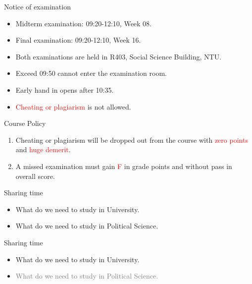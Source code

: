 \documentclass{beamer}
\begin{document}
\begin{frame}{Notice of examination}
\begin{itemize}
\item Midterm examination: 09:20-12:10, Week 08.
\item Final examination: 09:20-12:10, Week 16.
\item Both examinations are held in R403, Social Science Building, NTU.
\item Exceed 09:50 cannot enter the examination room.
\item Early hand in opens after 10:35.
\item \textcolor{red}{Cheating or plagiarism} is not allowed.
\end{itemize}
\end{frame}
\begin{frame}{Course Policy}
\begin{enumerate}
\item Cheating or plagiarism will be dropped out from the course with \textcolor{red}{zero points} and \textcolor{red}{huge demerit}. \\
\item A missed examination must gain \textcolor{red}{F} in grade points and without pass in overall score. 
\end{enumerate}
\end{frame}
\begin{frame}{Sharing time}
\begin{itemize}
\item What do we need to study in University.
\item What do we need to study in Political Science.
\end{itemize}
\end{frame}
\begin{frame}{Sharing time}
\begin{itemize}
\item What do we need to study in University.
\item \textcolor{gray}{What do we need to study in Political Science.}
\end{itemize}
\end{frame}
\end{document}
